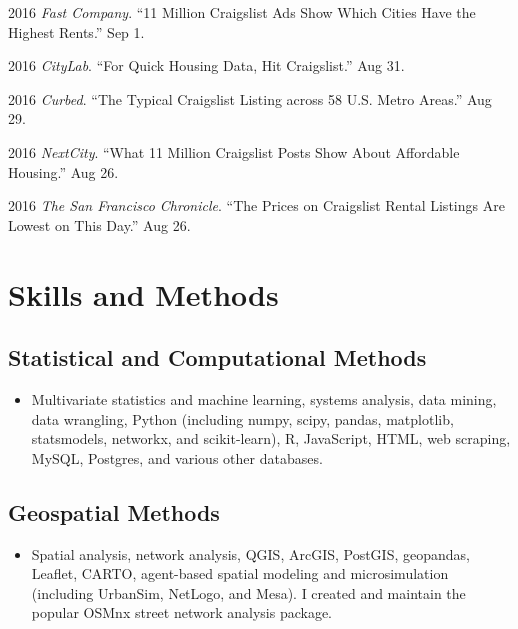 \documentclass{academiccv}
\begin{document}
\begin{tablist}
\item 2016 \tab \textit{Fast Company}. \enquote{11 Million Craigslist Ads Show Which Cities Have the Highest Rents.} Sep 1.

\item 2016 \tab \textit{CityLab}. \enquote{For Quick Housing Data, Hit Craigslist.} Aug 31.

\item 2016 \tab \textit{Curbed}. \enquote{The Typical Craigslist Listing across 58 U.S. Metro Areas.} Aug 29.

\item 2016 \tab \textit{NextCity}. \enquote{What 11 Million Craigslist Posts Show About Affordable Housing.} Aug 26.

\item 2016 \tab \textit{The San Francisco Chronicle}. \enquote{The Prices on Craigslist Rental Listings Are Lowest on This Day.} Aug 26.

\end{tablist}



\section*{Skills and Methods}

\subsection*{Statistical and Computational Methods}

\begin{itemize}
	
\item Multivariate statistics and machine learning, systems analysis, data mining, data wrangling, Python (including numpy, scipy, pandas, matplotlib, statsmodels, networkx, and scikit-learn), R, JavaScript, HTML, web scraping, MySQL, Postgres, and various other databases.

\end{itemize}

\subsection*{Geospatial Methods}

\begin{itemize}

\item Spatial analysis, network analysis, QGIS, ArcGIS, PostGIS, geopandas, Leaflet, CARTO, agent-based spatial modeling and microsimulation (including UrbanSim, NetLogo, and Mesa). I created and maintain the popular OSMnx street network analysis package.

\end{itemize}
\end{document}
